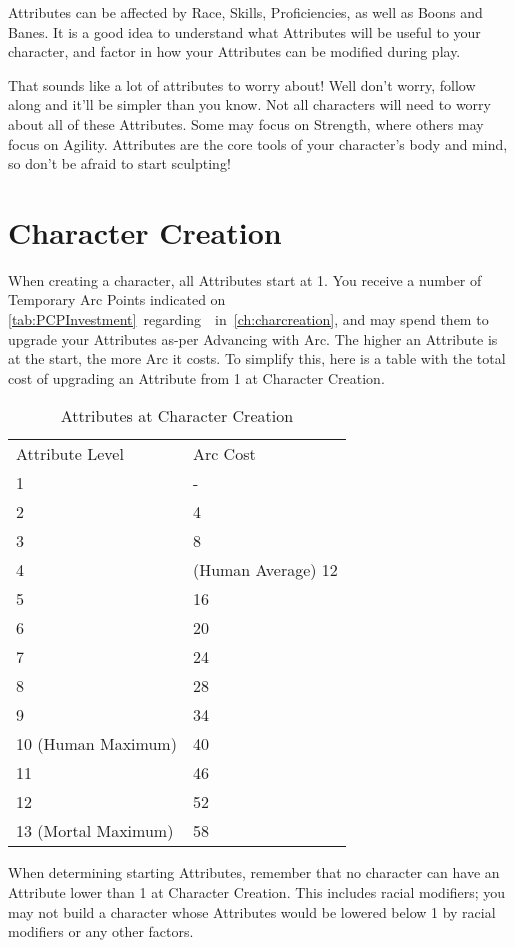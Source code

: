 \documentclass[oneside,11pt,english]{book}
\begin{document}
Attributes can be affected by Race, Skills, Proficiencies, as well as Boons and Banes. It is a good idea to 
understand what Attributes will be useful to your character, and factor in how your Attributes can be 
modified during play. 


That sounds like a lot of attributes to worry about! Well don't worry, follow along and it'll be simpler than 
you know. Not all characters will need to worry about all of these Attributes. Some may focus on 
Strength, where others may focus on Agility. Attributes are the core tools of your character’s body and 
mind, so don't be afraid to start sculpting! 
\section{Character Creation}
When creating a character, all Attributes start at 1. You receive a number of Temporary Arc Points 
indicated on \autoref{tab:PCPInvestment}~regarding~~in~\autoref{ch:charcreation}, and may spend them to upgrade your 
Attributes as-per Advancing with Arc. The higher an Attribute is at the start, the more Arc it costs. To 
simplify this, here is a table with the total cost of upgrading an Attribute from 1 at Character Creation. 
\begin{table}
	\caption{Attributes at Character Creation}
	\label{tab:AttributesatCharCreation}
\begin{tabu} to \textwidth {X[c]l}
Attribute Level&Arc Cost\\
1&-\\ 
2&4\\ 
3&8\\ 
4&(Human Average) 12\\
5&16\\ 
6&20\\ 
7&24\\ 
8&28\\ 
9&34\\ 
10 (Human Maximum)&40 \\
11&46\\
12&52\\
13 (Mortal Maximum)&58\\ 
\end{tabu}
\end{table}
When determining starting Attributes, remember that no character can have an Attribute lower than 1 at 
Character Creation. This includes racial modifiers; you may not build a character whose Attributes would 
be lowered below 1 by racial modifiers or any other factors. 
\end{document}
